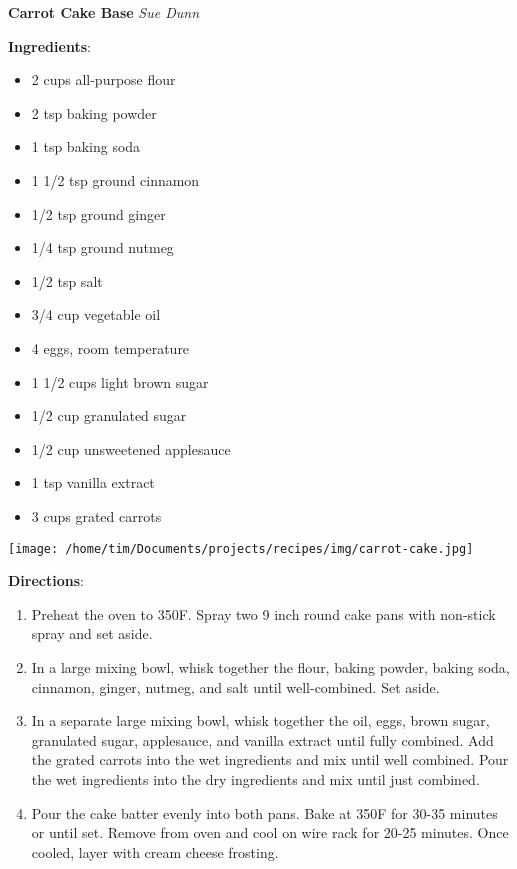 \documentclass[11pt, twoside, openany]{book}
\begin{document}
\noindent\begin{minipage}[t]{\linewidth}%
{\Large\textbf{Carrot Cake Base}} \label{carrot-cake-base}\hfill\textit{Sue Dunn}\\
\noindent\begin{minipage}[t]{0.78\linewidth}%
\textbf{Ingredients}:\vspace{-3mm}
\begin{multicols}{2}
\begin{itemize}\setlength\itemsep{-1mm}
\item 2 cups all-purpose flour
\item 2 tsp baking powder
\item 1 tsp baking soda
\item 1 1/2 tsp ground cinnamon
\item 1/2 tsp ground ginger
\item 1/4 tsp ground nutmeg
\item 1/2 tsp salt
\item 3/4 cup vegetable oil
\item 4 eggs, room temperature
\item 1 1/2 cups light brown sugar
\item 1/2 cup granulated sugar
\item 1/2 cup unsweetened applesauce
\item 1 tsp vanilla extract
\item 3 cups grated carrots
\end{itemize}
\end{multicols}
\end{minipage}
\noindent\begin{minipage}[t]{0.18\linewidth}
\centering \strut\vspace*{-\baselineskip}\newline
\texttt{[image: /home/tim/Documents/projects/recipes/img/carrot-cake.jpg]}\\
\end{minipage}\vspace{3mm}
\textbf{Directions}:
\vspace{-3mm}\begin{enumerate}\setlength\itemsep{-1mm}
\item Preheat the oven to 350F. Spray two 9 inch round cake pans with non-stick spray and set aside.
\item In a large mixing bowl, whisk together the flour, baking powder, baking soda, cinnamon, ginger, nutmeg, and salt until well-combined. Set aside.
\item In a separate large mixing bowl, whisk together the oil, eggs, brown sugar, granulated sugar, applesauce, and vanilla extract until fully combined. Add the grated carrots into the wet ingredients and mix until well combined. Pour the wet ingredients into the dry ingredients and mix until just combined.
\item Pour the cake batter evenly into both pans. Bake at 350F for 30-35 minutes or until set. Remove from oven and cool on wire rack for 20-25 minutes. Once cooled, layer with cream cheese frosting.
\end{enumerate}
\end{minipage}\vspace{8mm}
\end{document}
